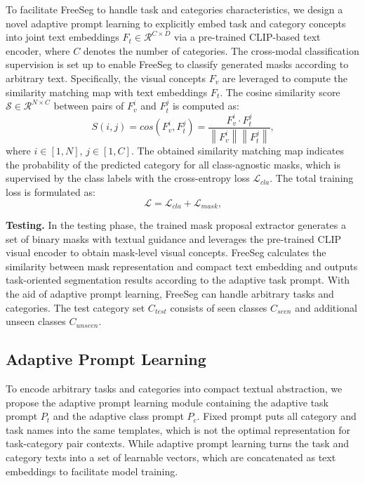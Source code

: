 \documentclass[10pt,twocolumn,letterpaper]{article}
\begin{document}
To facilitate FreeSeg to handle task and categories characteristics, we design a novel adaptive prompt learning to explicitly embed task and category concepts into joint text embeddings $F_t \in \mathcal{R}^{C \times D}$ via a pre-trained CLIP-based text encoder, where $C$ denotes the number of categories. 
The cross-modal classification supervision is set up to enable FreeSeg to classify generated masks according to arbitrary text.
Specifically, the visual concepts $F_v$ are leveraged to compute the similarity matching map with text embeddings $F_t$. The cosine similarity score $\mathcal{S} \in \mathcal{R}^{N \times C}$ between pairs of $F_v^i$ and $F_t^j$  is computed as:
\begin{equation}
    S(i, j) = cos(F_v^i, F_t^j) =\dfrac {F_v^i \cdot F_t^j} {\left\| F_v^i\right\| \left\| F_t^j\right\|} 
\text{,} 
    \end{equation}
where $i\in[1, N]$, $j\in[1,C]$.
The obtained similarity matching map indicates the probability of the predicted category for all class-agnostic masks, which is supervised by the class labels with the cross-entropy loss $\mathcal{L}_{cla}$.
The total training loss is formulated as:
\begin{equation}
    \mathcal{L} = \mathcal{L}_{cla} + \mathcal{L}_{mask}
\text{,} 
    \end{equation}


\textbf{Testing.}
In the testing phase, the trained mask proposal extractor generates a set of binary masks with textual guidance and leverages the pre-trained CLIP visual encoder to obtain mask-level visual concepts.
FreeSeg calculates the similarity between mask representation and compact text embedding and outputs task-oriented segmentation results according to the adaptive task prompt.
With the aid of adaptive prompt learning, FreeSeg can handle arbitrary tasks and categories. The test category set $C_{test}$ consists of seen classes $C_{seen}$ and additional unseen classes $C_{unseen}$.

 
\subsection{Adaptive Prompt Learning}
To encode arbitrary tasks and categories into compact textual abstraction, we propose the adaptive prompt learning module containing the adaptive task prompt $P_t$ and the adaptive class prompt $P_c$. 
Fixed prompt puts all category and task names into the same templates, which is not the optimal representation for task-category pair contexts. 
While adaptive prompt learning turns the task and category texts into a set of learnable vectors, which are concatenated as text embeddings to facilitate model training.
\end{document}

